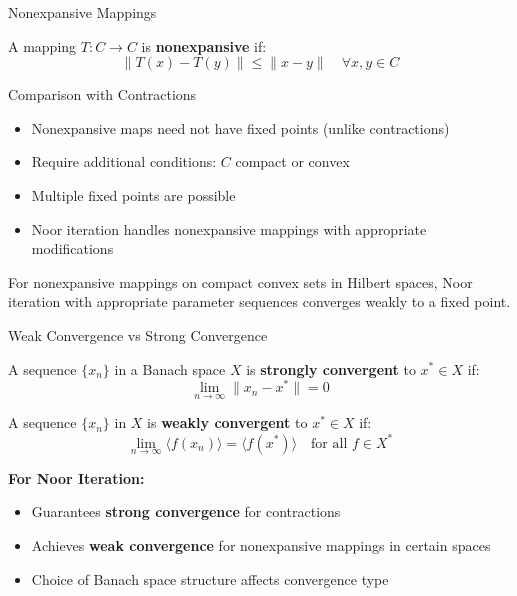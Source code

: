 \documentclass[aspectratio=169,10pt]{beamer}
\begin{document}
\begin{frame}{Nonexpansive Mappings}

\begin{definition}
A mapping $T: C \to C$ is \textbf{nonexpansive} if:
$$\|T(x) - T(y)\| \leq \|x - y\| \quad \forall x, y \in C$$
\end{definition}

\vspace{0.3cm}

\begin{block}{Comparison with Contractions}
\begin{itemize}
  \item Nonexpansive maps need not have fixed points (unlike contractions)
  \item Require additional conditions: $C$ compact or convex
  \item Multiple fixed points are possible
  \item Noor iteration handles nonexpansive mappings with appropriate modifications
\end{itemize}
\end{block}

\vspace{0.3cm}

\begin{theorem}
For nonexpansive mappings on compact convex sets in Hilbert spaces, Noor iteration with appropriate parameter sequences converges weakly to a fixed point.
\end{theorem}

\end{frame}

\begin{frame}{Weak Convergence vs Strong Convergence}

\begin{definition}
A sequence $\{x_n\}$ in a Banach space $X$ is \textbf{strongly convergent} to $x^* \in X$ if:
$$\lim_{n \to \infty} \|x_n - x^*\| = 0$$
\end{definition}

\vspace{0.3cm}

\begin{definition}
A sequence $\{x_n\}$ in $X$ is \textbf{weakly convergent} to $x^* \in X$ if:
$$\lim_{n \to \infty} \langle f(x_n) \rangle = \langle f(x^*) \rangle \quad \text{for all } f \in X^*$$
\end{definition}

\vspace{0.3cm}

\textbf{For Noor Iteration:}
\begin{itemize}
  \item Guarantees \textbf{strong convergence} for contractions
  \item Achieves \textbf{weak convergence} for nonexpansive mappings in certain spaces
  \item Choice of Banach space structure affects convergence type
\end{itemize}

\end{frame}
\end{document}
